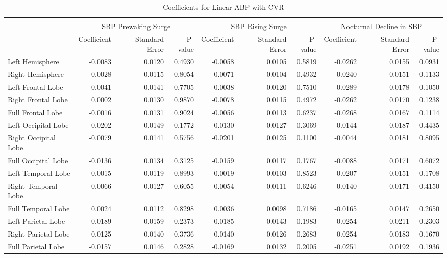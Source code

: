 \documentclass[10pt]{article}\usepackage[]{graphicx}\usepackage[]{color}
\begin{document}
\begin{landscape}
\begin{table}[ht]
\centering
\caption{Coefficients for Linear ABP with CVR} 
\begin{tabular}{lrrrrrrrrr}
  \toprule
 &  \\ 
  & \multicolumn{3}{c}{SBP Prewaking Surge} & 
                      \multicolumn{3}{c}{SBP Rising Surge} & 
                      \multicolumn{3}{c}{Nocturnal Decline in SBP} \\ & Coefficient & Standard Error & P-value 
                        & Coefficient & Standard Error & P-value 
                        & Coefficient & Standard Error & P-value \\ \midrule
Left Hemisphere & -0.0083 & 0.0120 & 0.4930 & -0.0058 & 0.0105 & 0.5819 & -0.0262 & 0.0155 & 0.0931 \\ 
  Right Hemisphere & -0.0028 & 0.0115 & 0.8054 & -0.0071 & 0.0104 & 0.4932 & -0.0240 & 0.0151 & 0.1133 \\ 
  Left Frontal Lobe & -0.0041 & 0.0141 & 0.7705 & -0.0038 & 0.0120 & 0.7510 & -0.0289 & 0.0178 & 0.1050 \\ 
  Right Frontal Lobe & 0.0002 & 0.0130 & 0.9870 & -0.0078 & 0.0115 & 0.4972 & -0.0262 & 0.0170 & 0.1238 \\ 
  Full Frontal Lobe & -0.0016 & 0.0131 & 0.9024 & -0.0056 & 0.0113 & 0.6237 & -0.0268 & 0.0167 & 0.1114 \\ 
  Left Occipital Lobe & -0.0202 & 0.0149 & 0.1772 & -0.0130 & 0.0127 & 0.3069 & -0.0144 & 0.0187 & 0.4435 \\ 
  Right Occipital Lobe & -0.0079 & 0.0141 & 0.5756 & -0.0201 & 0.0125 & 0.1100 & -0.0044 & 0.0181 & 0.8095 \\ 
  Full Occipital Lobe & -0.0136 & 0.0134 & 0.3125 & -0.0159 & 0.0117 & 0.1767 & -0.0088 & 0.0171 & 0.6072 \\ 
  Left Temporal Lobe & -0.0015 & 0.0119 & 0.8993 & 0.0019 & 0.0103 & 0.8523 & -0.0207 & 0.0151 & 0.1708 \\ 
  Right Temporal Lobe & 0.0066 & 0.0127 & 0.6055 & 0.0054 & 0.0111 & 0.6246 & -0.0140 & 0.0171 & 0.4150 \\ 
  Full Temporal Lobe & 0.0024 & 0.0112 & 0.8298 & 0.0036 & 0.0098 & 0.7186 & -0.0165 & 0.0147 & 0.2650 \\ 
  Left Parietal Lobe & -0.0189 & 0.0159 & 0.2373 & -0.0185 & 0.0143 & 0.1983 & -0.0254 & 0.0211 & 0.2303 \\ 
  Right Parietal Lobe & -0.0125 & 0.0140 & 0.3736 & -0.0140 & 0.0126 & 0.2683 & -0.0254 & 0.0183 & 0.1670 \\ 
  Full Parietal Lobe & -0.0157 & 0.0146 & 0.2828 & -0.0169 & 0.0132 & 0.2005 & -0.0251 & 0.0192 & 0.1936 \\ 
   \bottomrule
\end{tabular}
\end{table}

\end{landscape}
\end{document}
